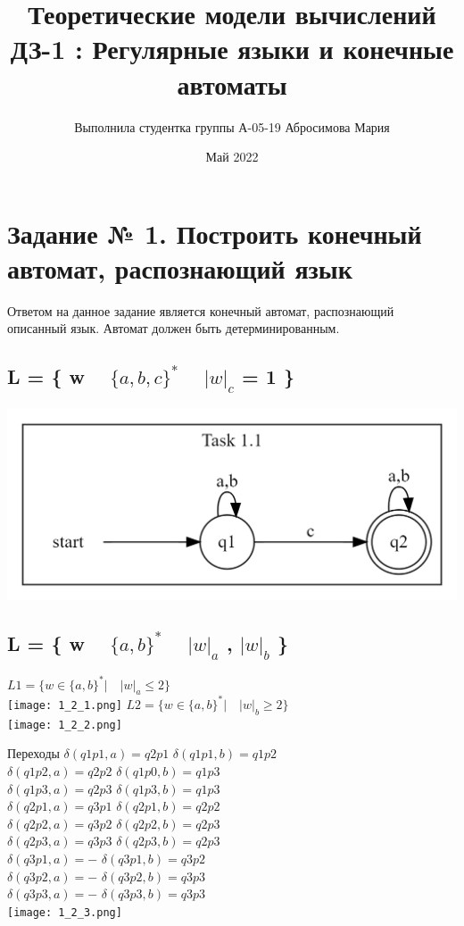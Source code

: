 \documentclass{article}
\title{Теоретические модели вычислений ДЗ-1 : Регулярные языки и конечные
автоматы}
\author{Выполнила студентка группы А-05-19 Абросимова Мария }
\date{Май 2022}
\begin{document}
    
\maketitle


\section{Задание № 1. Построить конечный автомат, распознающий язык} 
Ответом на данное задание является конечный автомат, распознающий описанный язык. Автомат должен быть детерминированным.
\subsection{L = \{ w \in ~ $\{a, b, c\}^*$ \mid ~ $|w|_{c}$ = 1 \}}
\includegraphics[scale=0.3]{1_1.png}

\subsection{L = \{ w \in ~  $\{a, b\}^*$ \mid  ~ $|w|_{a}$ , $|w|_{b}$   \}}
\newline$L1 = \{ w \in \{ a, b\}^* | \quad |w|_a \leq 2\}$ \\
\newline\texttt{[image: 1\_2\_1.png]}
\newline$L2 = \{ w \in \{ a, b\}^* | \quad |w|_b \geq 2 \}$\\
\newline\texttt{[image: 1\_2\_2.png]}

\noindent\newline Переходы
\newline 
$\delta(q1p1, a) = q2p1$ \quad $\delta(q1p1, b) = q1p2$ \\
$\delta(q1p2, a) = q2p2$ \quad  $\delta(q1p0, b) = q1p3$ \\
$\delta(q1p3, a) = q2p3$ \quad  $\delta(q1p3, b) = q1p3$ \\
$\delta(q2p1, a) = q3p1$ \quad  $\delta(q2p1, b) = q2p2$ \\
$\delta(q2p2, a) = q3p2$ \quad  $\delta(q2p2, b) = q2p3$ \\
$\delta(q2p3, a) = q3p3$ \quad  $\delta(q2p3, b) = q2p3$ \\
$\delta(q3p1, a) = - $ \quad  $\delta(q3p1, b) = q3p2$ \\
$\delta(q3p2, a) = -$ \quad  $\delta(q3p2, b) = q3p3$ \\
$\delta(q3p3, a) = -$ \quad  $\delta(q3p3, b) = q3p3$ \\
\newline\texttt{[image: 1\_2\_3.png]}
\end{document}
